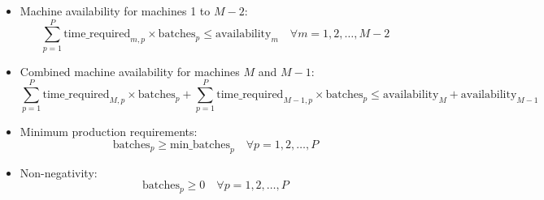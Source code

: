 \documentclass{article}
\begin{document}
\begin{itemize}
    \item Machine availability for machines 1 to \( M-2 \):
    \[
    \sum_{p=1}^{P} \text{time\_required}_{m,p} \times \text{batches}_p \leq \text{availability}_m \quad \forall m = 1, 2, \ldots, M-2
    \]
    
    \item Combined machine availability for machines \( M \) and \( M-1 \):
    \[
    \sum_{p=1}^{P} \text{time\_required}_{M,p} \times \text{batches}_p + \sum_{p=1}^{P} \text{time\_required}_{M-1,p} \times \text{batches}_p \leq \text{availability}_M + \text{availability}_{M-1}
    \]
    
    \item Minimum production requirements:
    \[
    \text{batches}_p \geq \text{min\_batches}_p \quad \forall p = 1, 2, \ldots, P
    \]
    
    \item Non-negativity:
    \[
    \text{batches}_p \geq 0 \quad \forall p = 1, 2, \ldots, P
    \]
\end{itemize}
\end{document}
